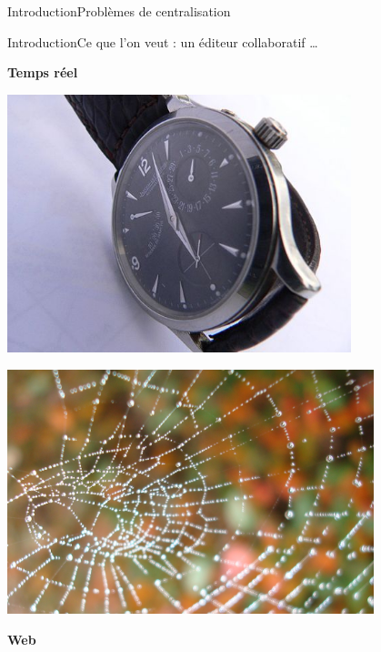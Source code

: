 \begin{frame}{Introduction}{Problèmes de centralisation}

\end{frame}


\begin{frame}{Introduction}{Ce que l'on veut : un éditeur collaboratif \ldots}
  
  \begin{minipage}{0.45\textwidth}
    \hfill \YES{\cmark} \textbf{Temps réel}
  \end{minipage}
  \begin{minipage}{0.45\textwidth}
    \includegraphics[width=0.75\textwidth]{img/watch.jpg}
  \end{minipage}
    
  \vspace{-0.75cm}

  \begin{minipage}{0.45\textwidth}
    \hfill  \includegraphics[width=0.8\textwidth]{img/toile.jpg}
  \end{minipage}  
  \begin{minipage}{0.45\textwidth}
    \textbf{Web} \YES{\cmark}
  \end{minipage}
  

\end{frame}
